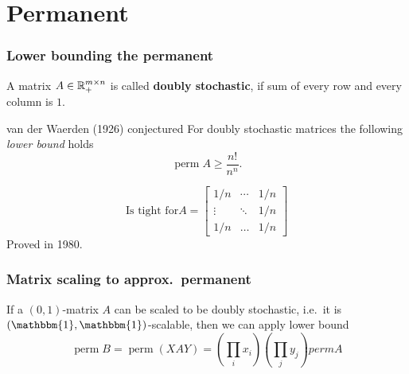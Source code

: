 \documentclass{beamer}
\DeclareMathOperator*{\perm}{perm}
\begin{document}
\section{Permanent}%
\label{sec:}

\begin{frame}
  \frametitle{Lower bounding the permanent}
  \begin{definition}
    A matrix $A \in \mathbb{R}^{m\times n}_+$ is called \textbf{doubly stochastic}, if sum of every row and every column is $1$.
  \end{definition}

  \begin{block}{van der Waerden (1926) conjectured}
    For doubly stochastic matrices the following \emph{lower bound} holds
    \begin{equation}
      \perm A \ge \frac{n!}{n^n}.
    \end{equation}
  \end{block}
  \begin{equation}
   \text{Is tight for} A = \begin{bmatrix}
      1/n & \cdots & 1/n \\
      \vdots & \ddots & 1/n \\
      1/n & \dots & 1/n
    \end{bmatrix}
  \end{equation}
  Proved in 1980.
\end{frame}


\begin{frame}
  \frametitle{Matrix scaling to approx.\ permanent}
  \begin{block}{}
    If a $(0, 1)$-matrix $A$ can be scaled to be doubly stochastic, i.e.\ it is $\left(\mathbbm{1}, \mathbbm{1}\right)$-scalable, then
    we can apply lower bound
    \begin{equation}
      \perm B = \perm (XAY) = \left(\prod_i x_i\right) \left(\prod_j y_j\right) perm A
    \end{equation}
  \end{block}
\end{frame}
\end{document}
